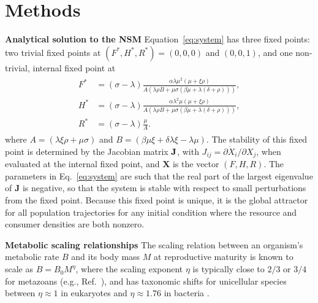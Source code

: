 \documentclass[twocolumn,preprintnumbers,amsmath,amssymb,superscriptaddress]{revtex4}
\begin{document}



\section*{Methods}
\small{
{\bf Analytical solution to the NSM}
Equation~\eqref{eq:system} has three fixed points: two trivial fixed points at $(F^*,H^*,R^*)=(0,0,0)$ and $(0,0,1)$, and one non-trivial, internal fixed point at
\begin{align}
\label{eq:ss}
\begin{split}
F^* &= (\sigma-\lambda)\frac{ \alpha  \lambda  \mu ^2  (\mu +\xi  \rho )}{A (\lambda  \rho  B+\mu  \sigma  (\beta  \mu +\lambda  (\delta +\rho )))}, \\
H^* &= (\sigma-\lambda)\frac{ \alpha  \lambda ^2 \mu  (\mu +\xi  \rho )}{A (\lambda  \rho  B+\mu  \sigma  (\beta  \mu +\lambda  (\delta +\rho )))}, \\
R^* &= (\sigma - \lambda)\frac{\mu  }{A}.
\end{split}
\end{align}
where $A=(\lambda \xi \rho +\mu \sigma )$ and
$B=(\beta \mu \xi +\delta \lambda \xi -\lambda \mu )$. The stability of this
fixed point is determined by the Jacobian matrix $\bf J$, with
$J_{ij}=\partial{\dot X_i}/\partial{X_j}$, when evaluated at the internal
fixed point, and $\mathbf{X}$ is the vector $(F,H,R)$.  The parameters in
Eq.~\eqref{eq:system} are such that the real part of the largest eigenvalue
of $\mathbf{J}$ is negative, so that the system is stable with respect to
small perturbations from the fixed point.  Because this fixed point is
unique, it is the global attractor for all population trajectories for any
initial condition where the resource and consumer densities are both nonzero.

{\bf Metabolic scaling relationships} The scaling relation between an
organism's metabolic rate $B$ and its body mass $M$ at reproductive maturity
is known to scale as $B = B_0 M^\eta$, where the scaling exponent $\eta$ is
typically close to $2/3$ or $3/4$ for metazoans (e.g.,
Ref.~\citep{West:2002it,Brown:2004wq}), and has taxonomic shifts for
unicellular species between $\eta\approx 1$ in eukaryotes and
$\eta\approx 1.76$ in bacteria \citep{DeLong:2010dy,Kempes:2012hy}.

}
\end{document}
